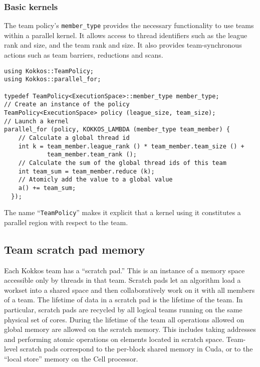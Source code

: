 \subsubsection{Basic kernels}\label{SS:Hierarchical:Teams:Kernels}

The team policy's \lstinline!member_type! provides the necessary functionality to use teams within a parallel kernel.
It allows access to thread identifiers such as the league rank and size, and the team rank and size.
It also provides team-synchronous actions such as team barriers, reductions and scans.
\begin{lstlisting}
using Kokkos::TeamPolicy;
using Kokkos::parallel_for;

typedef TeamPolicy<ExecutionSpace>::member_type member_type;
// Create an instance of the policy
TeamPolicy<ExecutionSpace> policy (league_size, team_size);
// Launch a kernel
parallel_for (policy, KOKKOS_LAMBDA (member_type team_member) {
    // Calculate a global thread id
    int k = team_member.league_rank () * team_member.team_size () +
            team_member.team_rank ();
    // Calculate the sum of the global thread ids of this team
    int team_sum = team_member.reduce (k);
    // Atomicly add the value to a global value
    a() += team_sum;
  });
\end{lstlisting}

The name ``\lstinline!TeamPolicy!'' makes it explicit that a kernel
using it constitutes a parallel region with respect to the team.

\subsection{Team scratch pad memory}\label{S:Hierarchical:Scratch}

Each Kokkos team has a ``scratch pad.''
This is an instance of a memory space accessible only by threads in that team.
Scratch pads let an algorithm load a workset into a shared space
and then collaboratively work on it with all members of a team.
The lifetime of data in a scratch pad is the lifetime of the team.
In particular, scratch pads are recycled by all logical teams running on the same physical set of cores.
During the lifetime of the team all operations allowed on global memory are allowed on the scratch memory.
This includes taking addresses and performing atomic operations on elements located in scratch space. 
Team-level scratch pads correspond to the per-block shared memory in Cuda,
or to the ``local store'' memory on the Cell processor.

